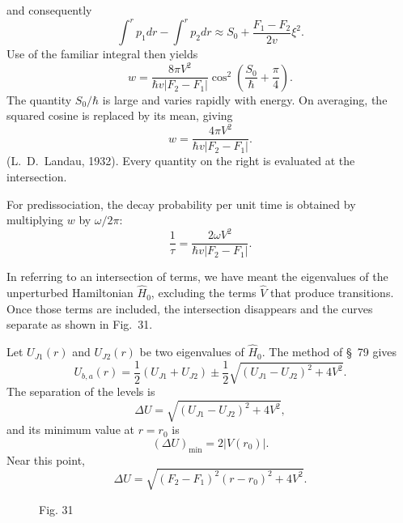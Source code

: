 and consequently
\[
\int^r p_1dr-\int^r p_2dr\approx S_0+\frac{F_1-F_2}{2v}\xi^2.
\]
Use of the familiar integral then yields
\begin{equation}w=\frac{8\pi V^2}{\hbar v|F_2-F_1|}\cos^2\left(\frac{S_0}{\hbar}+\frac\pi4\right).\tag{90.6}\end{equation}
The quantity $S_0/\hbar$ is large and varies rapidly with energy. On averaging, the squared cosine is replaced by its mean, giving
\begin{equation}w=\frac{4\pi V^2}{\hbar v|F_2-F_1|}.\tag{90.7}\end{equation}
(L.~D.~Landau, 1932). Every quantity on the right is evaluated at the intersection.

For predissociation, the decay probability per unit time is obtained by multiplying $w$ by $\omega/2\pi$:
\begin{equation}\frac1\tau=\frac{2\omega V^2}{\hbar v|F_2-F_1|}.\tag{90.8}\end{equation}

In referring to an intersection of terms, we have meant the eigenvalues of the unperturbed Hamiltonian $\widehat H_0$, excluding the terms $\widehat V$ that produce transitions. Once those terms are included, the intersection disappears and the curves separate as shown in Fig.~31.

Let $U_{J1}(r)$ and $U_{J2}(r)$ be two eigenvalues of $\widehat H_0$. The method of \S~79 gives
\begin{equation}U_{b,a}(r)=\frac12(U_{J1}+U_{J2})\pm\frac12\sqrt{(U_{J1}-U_{J2})^2+4V^2}.\tag{90.9}\end{equation}
The separation of the levels is
\begin{equation}\Delta U=\sqrt{(U_{J1}-U_{J2})^2+4V^2},\tag{90.10}\end{equation}
and its minimum value at $r=r_0$ is
\begin{equation}(\Delta U)_{\min}=2|V(r_0)|.\tag{90.11}\end{equation}
Near this point,
\begin{equation}\Delta U=\sqrt{(F_2-F_1)^2(r-r_0)^2+4V^2}.\tag{90.12}\end{equation}

\begin{figure}[ht]
\centering
{}
\caption*{Fig. 31}
\end{figure}

